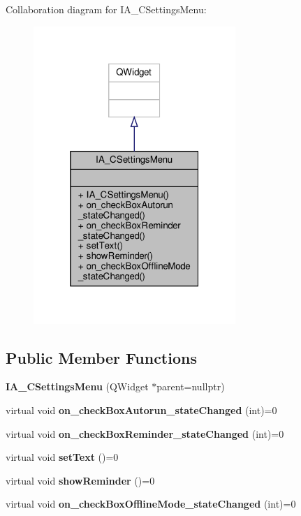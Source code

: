 Collaboration diagram for I\+A\+\_\+\+C\+Settings\+Menu\+:
\nopagebreak
\begin{figure}[H]
\begin{center}
\leavevmode
\includegraphics[width=217pt]{classIA__CSettingsMenu__coll__graph}
\end{center}
\end{figure}
\subsection*{Public Member Functions}
\begin{DoxyCompactItemize}
\item 
\mbox{\label{classIA__CSettingsMenu_a6a9100d0322f9e09ec4747fe7cc87d31}} 
{\bfseries I\+A\+\_\+\+C\+Settings\+Menu} (Q\+Widget $\ast$parent=nullptr)
\item 
\mbox{\label{classIA__CSettingsMenu_aa7ad4c439bcce32bdc91cb4e8c90f2a9}} 
virtual void {\bfseries on\+\_\+check\+Box\+Autorun\+\_\+state\+Changed} (int)=0
\item 
\mbox{\label{classIA__CSettingsMenu_af8f34bedc28f22de09b2b1cf745c05df}} 
virtual void {\bfseries on\+\_\+check\+Box\+Reminder\+\_\+state\+Changed} (int)=0
\item 
\mbox{\label{classIA__CSettingsMenu_ac64379fba7929eb3ec2c704f550c6704}} 
virtual void {\bfseries set\+Text} ()=0
\item 
\mbox{\label{classIA__CSettingsMenu_a1a2ac4f29c20e8df0835e8edc9fcb459}} 
virtual void {\bfseries show\+Reminder} ()=0
\item 
\mbox{\label{classIA__CSettingsMenu_a387a5e9fb96971ab6040c260e28f1c8f}} 
virtual void {\bfseries on\+\_\+check\+Box\+Offline\+Mode\+\_\+state\+Changed} (int)=0
\end{DoxyCompactItemize}


